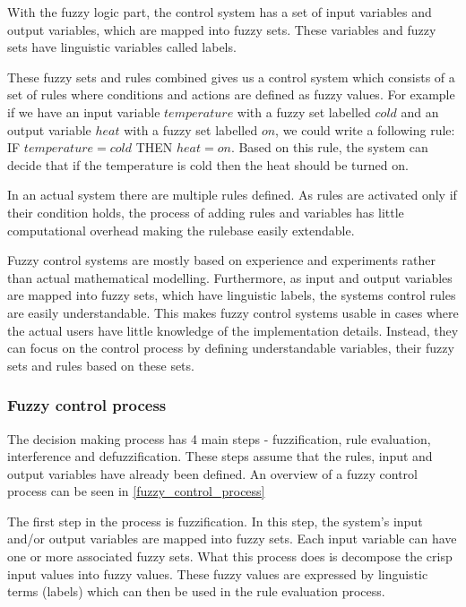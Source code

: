 With the fuzzy logic part, the control system has a set of input variables and output variables, which are mapped into fuzzy sets. These variables and fuzzy sets have linguistic variables called labels. 

These fuzzy sets and rules combined gives us a control system which consists of a set of rules where conditions and actions are defined as fuzzy values. For example if we have an input variable $temperature$ with a fuzzy set labelled $cold$ and an output variable $heat$ with a fuzzy set labelled $on$, we could write a following rule: IF $temperature = cold$ THEN $heat = on$. Based on this rule, the system can decide that if the temperature is cold then the heat should be turned on. 

In an actual system there are multiple rules defined. As rules are activated only if their condition holds, the process of adding rules and variables has little computational overhead making the rulebase easily extendable.

Fuzzy control systems are mostly based on experience and experiments rather than actual mathematical modelling. Furthermore, as input and output variables are mapped into fuzzy sets, which have linguistic labels, the systems control rules are easily understandable. This makes fuzzy control systems usable in cases where the actual users have little knowledge of the implementation details. Instead, they can focus on the control process by defining understandable variables, their fuzzy sets and rules based on these sets. 

\subsubsection{Fuzzy control process}

The decision making process has 4 main steps - fuzzification, rule evaluation, interference and defuzzification. These steps assume that the rules, input and output variables have already been defined. An overview of a fuzzy control process can be seen in \autoref{fuzzy_control_process}

The first step in the process is fuzzification. In this step, the system's input and/or output variables are mapped into fuzzy sets. Each input variable can have one or more associated fuzzy sets. What this process does is decompose the crisp input values into fuzzy values. These fuzzy values are expressed by linguistic terms (labels) which can then be used in the rule evaluation process.

